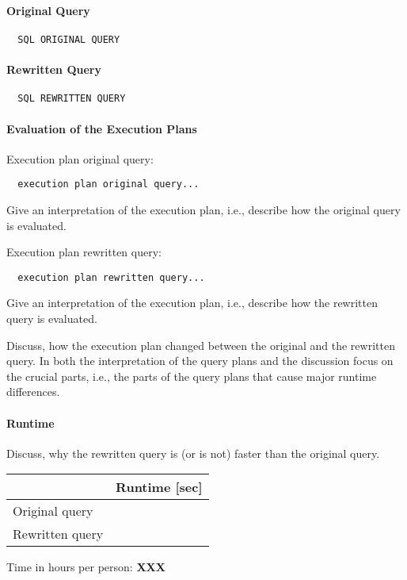 \documentclass[11pt]{scrartcl}
\begin{document}
\paragraph{Original Query}

{\small
\begin{verbatim}
  SQL ORIGINAL QUERY
\end{verbatim}
}

\paragraph{Rewritten Query}

{\small
\begin{verbatim}
  SQL REWRITTEN QUERY
\end{verbatim}
}

\paragraph{Evaluation of the Execution Plans}

Execution plan original query:

\begin{verbatim}
  execution plan original query...
\end{verbatim}

Give an interpretation of the execution plan, i.e., describe how the
original query is evaluated.

Execution plan rewritten query:

\begin{verbatim}
  execution plan rewritten query...
\end{verbatim}

Give an interpretation of the execution plan, i.e., describe how the
rewritten query is evaluated.

Discuss, how the execution plan changed between the original and the
rewritten query. In both the interpretation of the query plans and the
discussion focus on the crucial parts, i.e., the parts of the query
plans that cause major runtime differences.

\paragraph{Runtime} Discuss, why the rewritten query is (or is not)
faster than the original query.


\begin{table}[H]
  \begin{tabular}{l|r}
    & Runtime [sec] \\
   \hline
    Original query & \\
    Rewritten query & \\
  \end{tabular}
\end{table}


  Time in hours per person: {\bf XXX}
\end{document}
